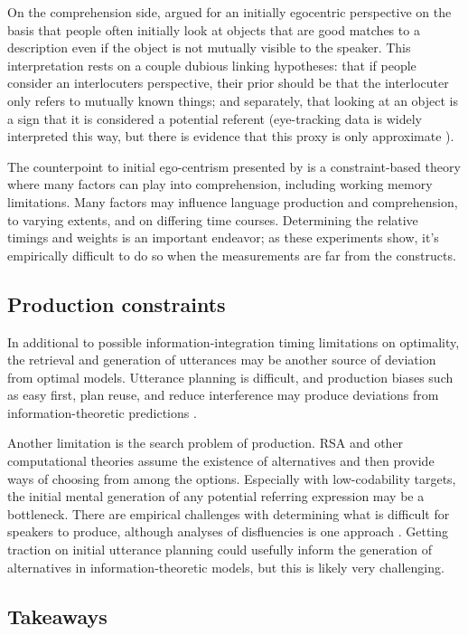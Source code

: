 \documentclass[]{article}
\begin{document}
On the comprehension side, \citet{keysar2000} argued for an initially egocentric perspective on the basis that people often initially look at objects that are good matches to a description even if the object is not mutually visible to the speaker. This interpretation rests on a couple dubious linking hypotheses: that if people consider an interlocuters perspective, their prior should be that the interlocuter only refers to mutually known things;  and separately, that looking at an object is a sign that it is considered a potential referent (eye-tracking data is widely interpreted this way, but there is evidence that this proxy is only approximate \citet{degena}).

The counterpoint to initial ego-centrism presented by \citet{hanna2003} is a constraint-based theory where many factors can play into comprehension, including working memory limitations. Many factors may influence language production and comprehension, to varying extents, and on differing time courses. Determining the relative timings and weights is an important endeavor; as these experiments show, it's empirically difficult to do so when the measurements are far from the constructs.

\subsection{Production constraints}
In additional to possible information-integration timing limitations on optimality, the retrieval and generation of utterances may be another source of deviation from optimal models. Utterance planning is difficult, and production biases such as easy first, plan reuse, and reduce interference may produce deviations from information-theoretic predictions \citep{macdonald2013}.

Another limitation is the search problem of production. RSA and other computational theories assume the existence of alternatives and then provide ways of choosing from among the options. Especially with low-codability targets, the initial mental generation of any potential referring expression may be a bottleneck. There are empirical challenges with determining what is difficult for speakers to produce, although analyses of disfluencies is one approach \citep{yoon2014}.  Getting traction on initial utterance planning could usefully inform the generation of alternatives in information-theoretic models, but this is likely very challenging. 

\subsection{Takeaways}
\end{document}
